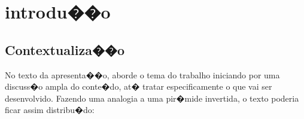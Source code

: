 \documentclass[pnumromarab, normaltoc, a4paper, 12pt]{abnt}
\begin{document}
\newcommand{\area}{�rea de ci�ncias exatas e ambientais}
\newcommand{\curso}{ci�ncia da computa��o}
\newcommand{\grau}{bacharelado}
\newcommand{\grautitulo}{bacharel}
\newcommand{\supervisortcc}{Prof. Fulano da Silva, Esp.,MSc., Dr.}
\newcommand{\coordenador}{Prof. Outro Fulano, Esp.,MSc., Dr.}
\newcommand{\membrobancaa}{Prof. Fulano da Silva, Esp.,MSc., Dr.}
\newcommand{\membrobancab}{Prof. Outro Fulano, Esp.,MSc., Dr.}
\newcommand{\datadefesa}{Dia de M�s de Ano (data da defesa)}

\renewcommand{\autor}{nome completo do aluno}
\renewcommand{\instituicao}{universidade comunit�ria da regi�o de chapec�}
\renewcommand{\titulo}{t�tulo do trabalho de conclus�o do curso}
\renewcommand{\local}{Chapec�}
\renewcommand{\data}{m�s (extenso) de ano (4 d�gitos)}
\renewcommand{\comentario}{Relat�rio do Trabalho de Conclus�o de Curso submetido
  � Universidade \mbox{Comunit�ria} da Regi�o de Chapec� para obten��o do t�tulo
  de bacharelado no curso de Ci�ncia da Computa��o.}
\renewcommand{\orientador}{Prof(a). Nome do(a) orientador(a)}
\renewcommand{\coorientador}{Prof(a). Nome do(a) co-orientador(a)}

\capa
\folhaderosto
\folhadeaprovacao







\listadesiglas

\listoffigures

\listoftables

\renewcommand{\contentsname}%
  {\vspace*{.8cm}
  \normalsize{\bfseries\MakeUppercase{sum�rio}}%
  \vspace{1.4cm}}

\sumario

\chapter{introdu��o}
\section{Contextualiza��o}
No texto da apresenta��o, aborde o tema do trabalho iniciando por uma discuss�o
ampla do conte�do, at� tratar especificamente o que vai ser desenvolvido.
Fazendo uma analogia a uma pir�mide invertida, o texto poderia ficar assim
distribu�do:
\end{document}
